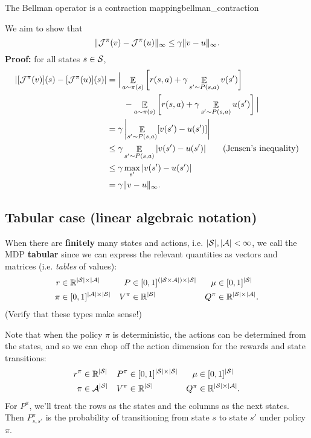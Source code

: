 \documentclass[\main/main]{subfiles}
\begin{document}
\begin{theorem}{The Bellman operator is a contraction mapping}{bellman_contraction}

We aim to show that
\[
    \|\bop^{\pi} (v) - \bop^{\pi} (u) \|_{\infty} \le \gamma \|v - u \|_{\infty}.
\]
\textbf{Proof:} for all states $s \in \S$,
\begin{align*}
|[\bop^{\pi} (v)](s) - [\bop^{\pi} (u)](s)|&= \Big| \mathop{\mathbb{E}}_{a \sim \pi(s)} \left[ r(s, a) + \gamma \mathop{\mathbb{E}}_{s' \sim P(s, a)} v(s') \right] \\
&\qquad - \mathop{\mathbb{E}}_{a \sim \pi(s)} \left[r(s, a) + \gamma \mathop{\mathbb{E}}_{s' \sim P(s, a)} u(s') \right] \Big| \\
&= \gamma \left|\mathop{\mathbb{E}}_{s' \sim P(s, a)} [v(s') - u(s')] \right| \\
&\le \gamma \mathop{\mathbb{E}}_{s' \sim P(s, a)}|v(s') - u(s')| \qquad \text{(Jensen's inequality)} \\
&\le \gamma \max_{s'} |v(s') - u(s')| \\
&= \gamma \|v - u \|_{\infty}.
\end{align*}

\end{theorem}

\subsection{Tabular case (linear algebraic notation)}

When there are \textbf{finitely} many states and actions, i.e. $|\S|, |\A| < \infty$, we call the MDP \textbf{tabular} since we can express the relevant quantities as vectors and matrices (i.e. \emph{tables} of values):
\begin{align*}
    r &\in \R^{|\S| \times |\A|} &
    P &\in [0, 1]^{(|\S \times \A|) \times |\S|} &
    \mu &\in [0, 1]^{|\S|} \\
    \pi &\in [0, 1]^{|\A| \times |\S|} &
    V^\pi &\in \R^{|\S|} &
    Q^\pi &\in \R^{|\S| \times |\A|}.
\end{align*}
(Verify that these types make sense!)

Note that when the policy $\pi$ is deterministic, the actions can be determined from the states, and so we can chop off the action dimension for the rewards and state transitions:
\begin{align*}
    r^{\pi} &\in \R^{|\S|} & P^{\pi} &\in [0, 1]^{|\S| \times |\S|} & \mu &\in [0, 1]^{|\S|} \\
    \pi &\in \A^{|\S|} & V^\pi &\in \R^{|\S|} & Q^\pi &\in \R^{|\S| \times |\A|}.
\end{align*}
For $P^\pi$, we'll treat the rows as the states and the columns as the next states. Then $P^\pi_{s, s'}$ is the probability of transitioning from state $s$ to state $s'$ under policy $\pi$.
\end{document}
